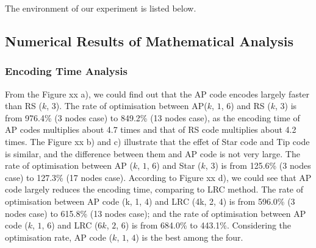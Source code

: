 \documentclass[sigconf]{acmart}
\begin{document}
The environment of our experiment is listed below.


\subsection{Numerical Results of Mathematical Analysis}
\subsubsection{Encoding Time Analysis}
From the Figure xx a), we could find out that the AP code encodes largely faster than RS ($k$, $3$). The rate of optimisation between AP($k$, $1$, $6$) and RS ($k$, $3$) is from 976.4\% (3 nodes case) to 849.2\% (13 nodes case), as the encoding time of AP codes multiplies about 4.7 times and that of RS code multiplies about 4.2 times. The Figure xx b) and c) illustrate that the effet of Star code and Tip code is similar, and the difference between them and AP code is not very large. The rate of optimisation between AP ($k$, $1$, $6$) and Star ($k$, $3$) is from 125.6\% (3 nodes case) to 127.3\% (17 nodes case). According to Figure xx d), we could see that AP code largely reduces the encoding time, comparing to LRC method. The rate of optimisation between AP code (k, 1, 4) and LRC (4k, 2, 4) is from 596.0\% (3 nodes case) to 615.8\% (13 nodes case); and the rate of optimisation between AP code ($k$, $1$, $6$) and LRC ($6k$, $2$, $6$) is from 684.0\% to 443.1\%. Considering the optimisation rate, AP code ($k$, $1$, $4$) is the best among the four.\par
\end{document}
